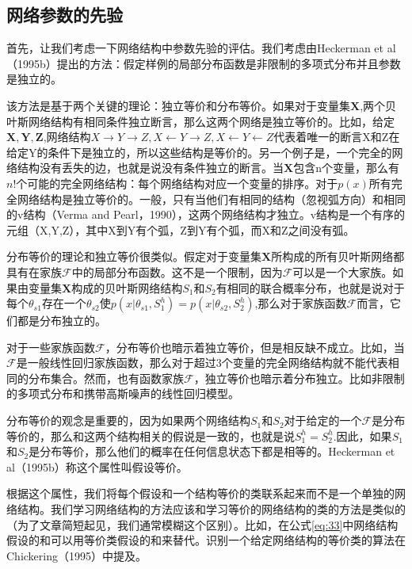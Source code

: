 \documentclass[10pt,a4paper]{article}
\begin{document}
\begin{CJK*}{UTF8}{gkai}
\subsection{网络参数的先验}
首先，让我们考虑一下网络结构中参数先验的评估。我们考虑由Heckerman et al（1995b）提出的方法：假定样例的局部分布函数是非限制的多项式分布并且参数是独立的。


该方法是基于两个关键的理论：独立等价和分布等价。如果对于变量集$\boldsymbol{X}$,两个贝叶斯网络结构有相同条件独立断言，那么这两个网络是独立等价的。比如，给定$\boldsymbol{X,Y,Z}$,网络结构$X \rightarrow Y \rightarrow Z,X \leftarrow Y \rightarrow Z,X \leftarrow Y \leftarrow Z$代表着唯一的断言X和Z在给定Y的条件下是独立的，所以这些结构是等价的。另一个例子是，一个完全的网络结构没有丢失的边，也就是说没有条件独立的断言。当$\boldsymbol{X}$包含n个变量，那么有$n!$个可能的完全网络结构：每个网络结构对应一个变量的排序。对于$p(x)$所有完全网络结构是独立等价的。一般，只有当他们有相同的结构（忽视弧方向）和相同的v结构（Verma and Pearl，1990），这两个网络结构才独立。v结构是一个有序的元组（X,Y,Z），其中X到Y有个弧，Z到Y有个弧，而X和Z之间没有弧。


分布等价的理论和独立等价很类似。假定对于变量集$\boldsymbol{X}$所构成的所有贝叶斯网络都具有在家族$\mathcal{F}$中的局部分布函数。这不是一个限制，因为$\mathcal{F}$可以是一个大家族。如果由变量集$\boldsymbol{X}$构成的贝叶斯网络结构$S_1$和$S_2$有相同的联合概率分布，也就是说对于每个$\theta_{s1}$存在一个$\theta_{s2}$使$p(x|\theta_{s1},S_1^h)=p(x|\theta_{s2},S_2^h)$,那么对于家族函数$\mathcal{F}$而言，它们都是分布独立的。


对于一些家族函数$\mathcal{F}$，分布等价也暗示着独立等价，但是相反缺不成立。比如，当$\mathcal{F}$是一般线性回归家族函数，那么对于超过3个变量的完全网络结构就不能代表相同的分布集合。然而，也有函数家族$\mathcal{F}$，独立等价也暗示着分布独立。比如非限制的多项式分布和携带高斯噪声的线性回归模型。



分布等价的观念是重要的，因为如果两个网络结构$S_1$和$S_2$对于给定的一个$\mathcal{F}$是分布等价的，那么和这两个结构相关的假说是一致的，也就是说$S_1^h=S_2^h$.因此，如果$S_1$和$S_2$是分布等价，那么他们的概率在任何信息状态下都是相等的。Heckerman et al（1995b）称这个属性叫假设等价。


根据这个属性，我们将每个假设和一个结构等价的类联系起来而不是一个单独的网络结构。我们学习网络结构的方法应该和学习等价的网络结构的类的方法是类似的（为了文章简短起见，我们通常模糊这个区别）。比如，在公式\ref{eq:33}中网络结构假设的和可以用等价类假设的和来替代。识别一个给定网络结构的等价类的算法在Chickering（1995）中提及。




\end{CJK*}
\end{document}
